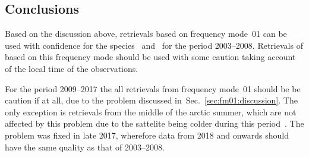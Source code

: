 \subsection{Conclusions}
\label{sec:fm01:conclusions}
Based on the discussion above, retrievals based on frequency mode~01 can be
used with confidence for the species~ and~ for the
period 2003--2008. Retrievals of  based on this frequency mode
should be used with some caution taking account of the local time of the
observations.

For the period 2009--2017 the all retrievals from frequency mode~01 should be
be caution if at all, due to the problem discussed
in~Sec.~\ref{sec:fm01:discussion}. The only exception is retrievals from the
middle of the arctic summer, which are not affected by this problem due to the
sattelite being colder during this period~\cite{postlaunch:2006}. The problem
was fixed in late 2017, wherefore data from 2018 and onwards should have the
same quality as that of 2003--2008.
